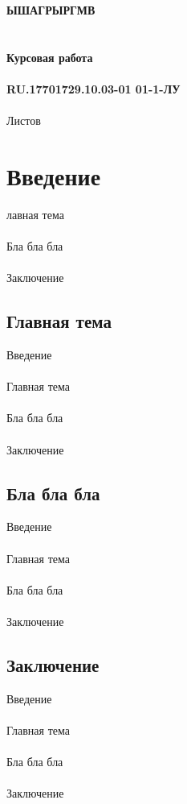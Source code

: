 \documentclass{article}
\begin{document}
\fontsize{14}{16}\selectfont
\thispagestyle{empty}
\begin{center}
\clearpage
{}
\bigskip
\begin{center}
\topskip=0pt
\vspace*{\fill}
\textbf{ЫШАГРЫРГМВ~\\
~\\
~\\
Курсовая работа\\
~\\
RU.17701729.10.03-01 01-1-ЛУ}\\
~\\
Листов \ztotpages\\
\vspace*{\fill}
\end{center}
\begin{center}
\end{center}
\newpage
\tableofcontents
\newpage
\newpage
\section{Введение}
лавная тема\\
~\\
Бла бла бла\\
~\\
Заключение
\subsection{Главная тема}
Введение\\
~\\
Главная тема\\
~\\
Бла бла бла\\
~\\
Заключение
\subsection{Бла бла бла}
Введение\\
~\\
Главная тема\\
~\\
Бла бла бла\\
~\\
Заключение
\subsection{Заключение}
Введение\\
~\\
Главная тема\\
~\\
Бла бла бла\\
~\\
Заключение\\
~\\


\end{center}
\end{document}
